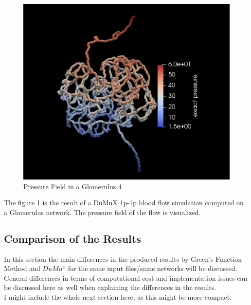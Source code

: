 \begin{figure}[h]
\centering
\includegraphics[width=162mm]{nephron4_pressure}
\caption{Pressure Field in a Glomerulus 4}
\label{fig:nephron4_pressure}
\end{figure}
The figure \ref{fig:nephron4_pressure} is the result of a DuMuX 1p-1p blood flow simulation computed on a Glomerulus network. The pressure field of the flow is visualized.\\

\subsection{Comparison of the Results}
In this section the main differences in the produced results by Green's Function Method and $DuMu^x$ for the same input files/same networks will be discussed.
\\General differences in terms of computational cost and implementation issues can be discussed here as well when explaining the differences in the results.
\\I might include the whole next section here, as this might be more compact.


